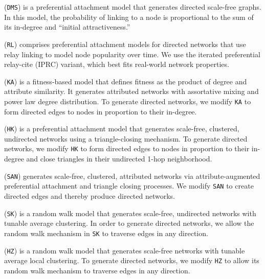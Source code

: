 		 \cite{dorogovtsev2000structure}  (\texttt{DMS})
		is a preferential attachment model that generates directed scale-free graphs. In this model,
		the probability of linking to a node is proportional to the sum of its in-degree and ``initial attractiveness.''

		 \cite{singh2017relay} (\texttt{RL}) comprises
		preferential attachment models for directed networks that use relay linking to model
		node popularity over time. We use the iterated preferential relay-cite (IPRC) variant, which best fits
		real-world network properties.

		 \cite{kim2017effect} (\texttt{KA}) is a fitness-based model that defines
		fitness as the product of degree and attribute similarity. It generates {attributed} networks
		with assortative mixing and power law degree distribution.
		To generate directed networks, we modify \texttt{KA} to form directed edges to nodes in proportion to their in-degree.

		 \cite{holme2002growing} (\texttt{HK}) is a preferential attachment model
		that generates scale-free, clustered, undirected networks using a triangle-closing mechanism.
		To generate directed networks, we modify \texttt{HK} to form directed edges to nodes in proportion to their in-degree
		and close triangles in their undirected 1-hop neighborhood.


		 \cite{gong2012evolution} (\texttt{SAN}) generates
		scale-free, clustered, attributed networks via attribute-augmented
		preferential attachment and triangle closing processes.
		We modify \texttt{SAN} to create directed edges and thereby produce directed networks.

		 \cite{saramaki2004scale} (\texttt{SK})
		is a random walk model that generates scale-free, undirected networks with tunable average clustering.
		In order to generate directed networks, we allow the random walk mechanism in \texttt{SK} to traverse edges in any direction.

		 \cite{herrera2011generating} (\texttt{HZ}) is a random walk model
		that generates scale-free networks with tunable average local clustering. To generate directed networks,
		we modify \texttt{HZ} to allow its random walk mechanism to traverse edges in any direction.


